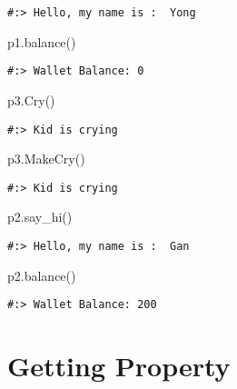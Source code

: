\documentclass[
]{book}
\newenvironment{Shaded}{\begin{snugshade}}{\end{snugshade}}
\newcommand{\NormalTok}[1]{#1}
\begin{document}
\begin{verbatim}
#:> Hello, my name is :  Yong
\end{verbatim}

\begin{Shaded}
\begin{Highlighting}[]
\NormalTok{p1.balance()}
\end{Highlighting}
\end{Shaded}

\begin{verbatim}
#:> Wallet Balance: 0
\end{verbatim}

\begin{Shaded}
\begin{Highlighting}[]
\NormalTok{p3.Cry()}
\end{Highlighting}
\end{Shaded}

\begin{verbatim}
#:> Kid is crying
\end{verbatim}

\begin{Shaded}
\begin{Highlighting}[]
\NormalTok{p3.MakeCry()}
\end{Highlighting}
\end{Shaded}

\begin{verbatim}
#:> Kid is crying
\end{verbatim}

\begin{Shaded}
\begin{Highlighting}[]
\NormalTok{p2.say\_hi()}
\end{Highlighting}
\end{Shaded}

\begin{verbatim}
#:> Hello, my name is :  Gan
\end{verbatim}

\begin{Shaded}
\begin{Highlighting}[]
\NormalTok{p2.balance()}
\end{Highlighting}
\end{Shaded}

\begin{verbatim}
#:> Wallet Balance: 200
\end{verbatim}

\hypertarget{getting-property}{%
\section{Getting Property}\label{getting-property}}
\end{document}
